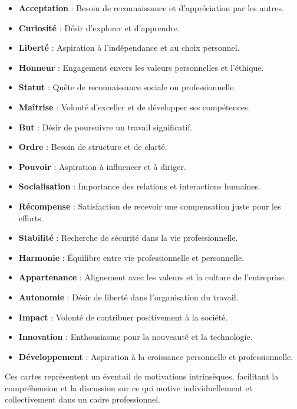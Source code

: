 \documentclass[parskip=full]{scrartcl}
\begin{document}
\begin{minipage}[t]{\textwidth}
\begin{multicols}{2}
        \begin{itemize}
            \item \textbf{Acceptation} : Besoin de reconnaissance et d'appréciation par les autres.
            \item \textbf{Curiosité} : Désir d'explorer et d'apprendre.
            \item \textbf{Liberté} : Aspiration à l'indépendance et au choix personnel.
            \item \textbf{Honneur} : Engagement envers les valeurs personnelles et l'éthique.
            \item \textbf{Statut} : Quête de reconnaissance sociale ou professionnelle.
            \item \textbf{Maîtrise} : Volonté d'exceller et de développer ses compétences.
            \item \textbf{But} : Désir de poursuivre un travail significatif.
            \item \textbf{Ordre} : Besoin de structure et de clarté.
            \item \textbf{Pouvoir} : Aspiration à influencer et à diriger.
            \item \textbf{Socialisation} : Importance des relations et interactions humaines.
            \item \textbf{Récompense} : Satisfaction de recevoir une compensation juste pour les efforts.
            \item \textbf{Stabilité} : Recherche de sécurité dans la vie professionnelle.
            \item \textbf{Harmonie} : Équilibre entre vie professionnelle et personnelle.
            \item \textbf{Appartenance} : Alignement avec les valeurs et la culture de l'entreprise.
            \item \textbf{Autonomie} : Désir de liberté dans l'organisation du travail.
            \item \textbf{Impact} : Volonté de contribuer positivement à la société.
            \item \textbf{Innovation} : Enthousiasme pour la nouveauté et la technologie.
            \item \textbf{Développement} : Aspiration à la croissance personnelle et professionnelle.
        \end{itemize}
        Ces cartes représentent un éventail de motivations intrinsèques, facilitant la compréhension et la discussion sur ce qui motive individuellement et collectivement dans un cadre professionnel.

    \end{multicols}
\end{minipage}
\end{document}
